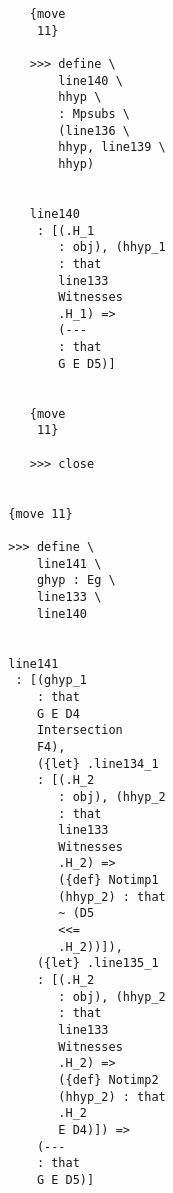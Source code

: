 \documentclass[12pt]{article}
\begin{document}
\begin{verbatim}
                                    {move 
                                     11}

                                    >>> define \
                                        line140 \
                                        hhyp \
                                        : Mpsubs \
                                        (line136 \
                                        hhyp, line139 \
                                        hhyp)


                                    line140 
                                     : [(.H_1 
                                        : obj), (hhyp_1 
                                        : that 
                                        line133 
                                        Witnesses 
                                        .H_1) => 
                                        (--- 
                                        : that 
                                        G E D5)]


                                    {move 
                                     11}

                                    >>> close


                                 {move 11}

                                 >>> define \
                                     line141 \
                                     ghyp : Eg \
                                     line133 \
                                     line140


                                 line141 
                                  : [(ghyp_1 
                                     : that 
                                     G E D4 
                                     Intersection 
                                     F4), 
                                     ({let} .line134_1 
                                     : [(.H_2 
                                        : obj), (hhyp_2 
                                        : that 
                                        line133 
                                        Witnesses 
                                        .H_2) => 
                                        ({def} Notimp1 
                                        (hhyp_2) : that 
                                        ~ (D5 
                                        <<= 
                                        .H_2))]), 
                                     ({let} .line135_1 
                                     : [(.H_2 
                                        : obj), (hhyp_2 
                                        : that 
                                        line133 
                                        Witnesses 
                                        .H_2) => 
                                        ({def} Notimp2 
                                        (hhyp_2) : that 
                                        .H_2 
                                        E D4)]) => 
                                     (--- 
                                     : that 
                                     G E D5)]



\end{verbatim}
\end{document}
